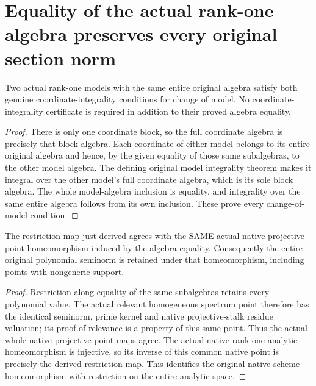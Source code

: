 \section{Equality of the actual rank-one algebra preserves every original section norm}
\begin{lemma}\label{lem:rank-one-algebra-derived-model-change}
\leanok
{}
Two actual rank-one models with the same entire original algebra satisfy both genuine coordinate-integrality conditions for change of model. No coordinate-integrality certificate is required in addition to their proved algebra equality.
\end{lemma}
\begin{proof}
There is only one coordinate block, so the full coordinate algebra is precisely that block algebra. Each coordinate of either model belongs to its entire original algebra and hence, by the given equality of those same subalgebras, to the other model algebra. The defining original model integrality theorem makes it integral over the other model's full coordinate algebra, which is its sole block algebra. The whole model-algebra inclusion is equality, and integrality over the same entire algebra follows from its own inclusion. These prove every change-of-model condition.
\end{proof}
\begin{theorem}\label{thm:rank-one-algebra-native-norm-comparison}
\leanok
{}
The restriction map just derived agrees with the SAME actual native-projective-point homeomorphism induced by the algebra equality. Consequently the entire original polynomial seminorm is retained under that homeomorphism, including points with nongeneric support.
\end{theorem}
\begin{proof}
Restriction along equality of the same subalgebras retains every polynomial value. The actual relevant homogeneous spectrum point therefore has the identical seminorm, prime kernel and native projective-stalk residue valuation; its proof of relevance is a property of this same point. Thus the actual whole native-projective-point maps agree. The actual native rank-one analytic homeomorphism is injective, so its inverse of this common native point is precisely the derived restriction map. This identifies the original native scheme homeomorphism with restriction on the entire analytic space.
\end{proof}
